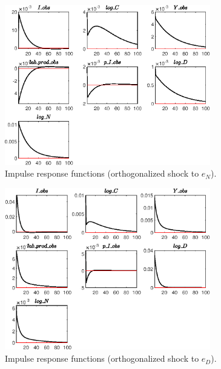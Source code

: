 \begin{figure}[H]
\centering 
\includegraphics[width=0.80\textwidth]{BRS/graphs/BRS_IRF_e_N}
\caption{Impulse response functions (orthogonalized shock to ${e_N}$).}
\label{Fig:IRF:e_N}
\end{figure}
 
\begin{figure}[H]
\centering 
\includegraphics[width=0.80\textwidth]{BRS/graphs/BRS_IRF_e_D}
\caption{Impulse response functions (orthogonalized shock to ${e_D}$).}
\label{Fig:IRF:e_D}
\end{figure}
 
 
